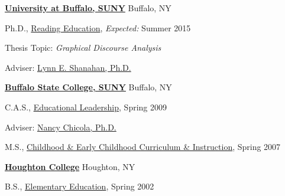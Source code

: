 \href{http://www.buffalo.edu/}{\textbf{University at Buffalo, SUNY}}
Buffalo, NY
\begin{outerlist}

\item[] Ph.D.,
        \href{http://gse.buffalo.edu/lai/doc}
             {Reading Education},
             \emph{Expected:} Summer 2015
        \begin{innerlist}
        \item Thesis Topic: \emph{Graphical Discourse Analysis}
        \item Adviser:
              \href{http://gse.buffalo.edu/about/directory/faculty/2110}
                   {Lynn E. Shanahan, Ph.D.}
        \end{innerlist}
\end{outerlist}
\vspace{.1in}

\href{http://www.buffalostate.edu/}{\textbf{Buffalo State College, SUNY}}
Buffalo, NY
\begin{outerlist}

\item[] C.A.S.,
        \href{http://www.buffalostate.edu/gradprog.xml?bpid=27}
             {Educational Leadership},
             Spring 2009
        \begin{innerlist}
        \item Adviser:
              \href{http://elementaryeducation.buffalostate.edu/faculty/nancy-chicola}
                   {Nancy Chicola, Ph.D.}
        \end{innerlist}
\end{outerlist}
\vspace{.1in}

\begin{outerlist}

\item[] M.S.,
        \href{http://www.buffalostate.edu/gradprog.xml?bpid=27}
             {Childhood \& Early Childhood Curriculum \& Instruction},
             Spring 2007
\end{outerlist}
\vspace{.1in}

\href{http://www.houghton.edu/}{\textbf{Houghton College}}
Houghton, NY
\begin{outerlist}

\item[] B.S.,
        \href{http://www.houghton.edu/education/}
             {Elementary Education},
             Spring 2002
\end{outerlist}
\vspace{.1in}


